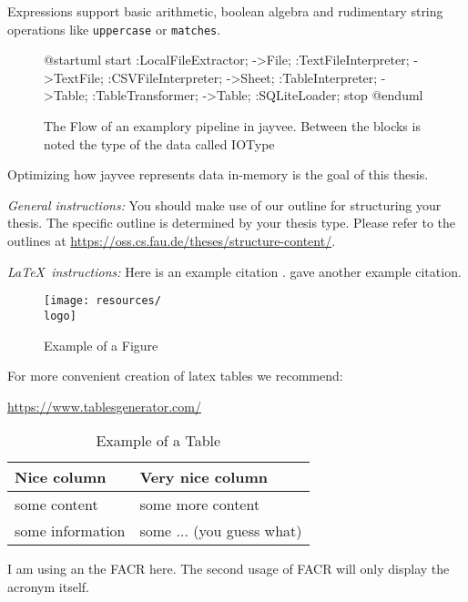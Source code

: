 Expressions support basic arithmetic, boolean algebra and rudimentary string operations like \Verb|uppercase| or \Verb|matches|.

\begin{figure}
	\begin{plantuml}
		@startuml
		start
		:LocalFileExtractor;
		->File;
		:TextFileInterpreter;
		->TextFile;
		:CSVFileInterpreter;
		->Sheet;
		:TableInterpreter;
		->Table;
		:TableTransformer;
		->Table;
		:SQLiteLoader;
		stop
		@enduml
	\end{plantuml}
	\caption{The Flow of an examplory pipeline in jayvee. Between the blocks is noted the type of the data called IOType}
	\label{fig:}
\end{figure}


Optimizing how jayvee represents data in-memory is the goal of this thesis.

\newpage

{\textsl{General instructions:}}
You should make use of our outline for structuring your
thesis. The specific outline is determined by your thesis type.
Please refer to the outlines at
\url{https://oss.cs.fau.de/theses/structure-content/}.

{\textsl{\LaTeX\ instructions:}} Here is an example citation
\autocite{riehle:2011:controlling}.
\textcite{riehle:2007:economic} gave another example citation.

\begin{figure}[ht]
	\texttt{[image: resources/\\logo]}
	\caption{Example of a Figure}
	\label{fig:example}
\end{figure}

For more convenient creation of latex tables we recommend:

\url{https://www.tablesgenerator.com/}

\begin{table}[ht]
	\caption{Example of a Table}
	\label{tab:example}
	\begin{tabular}{|l|l|}
		\hline
		Nice column      & Very nice column          \\
		\hline
		some content     & some more content         \\
		some information & some ... (you guess what) \\
		\hline
	\end{tabular}
\end{table}

I am using an the \ac{FACR} here. The second usage of \ac{FACR} will only display the acronym itself.
